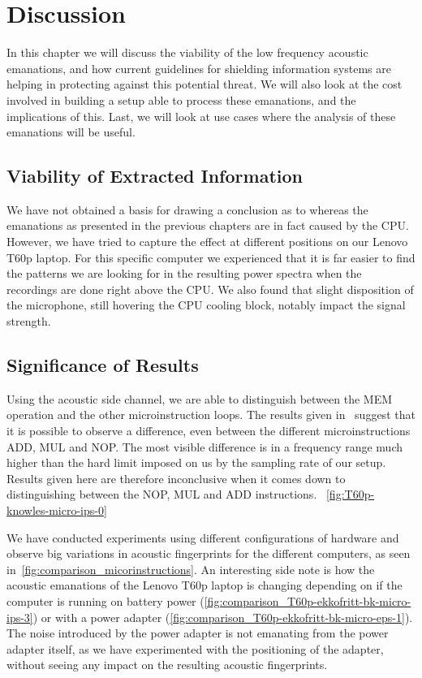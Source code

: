 \chapter{Discussion}\label{chp6:discussion}

In this chapter we will discuss the viability of the low frequency acoustic emanations, and how current guidelines for shielding information systems are helping in protecting against this potential threat.
We will also look at the cost involved in building a setup able to process these emanations, and the implications of this.
Last, we will look at use cases where the analysis of these emanations will be useful.

\section{Viability of Extracted Information}
We have not obtained a basis for drawing a conclusion as to whereas the emanations as presented in the previous chapters are in fact caused by the \gls{CPU}.
However, we have tried to capture the effect at different positions on our Lenovo T60p laptop. 
For this specific computer we experienced that it is far easier to find the patterns we are looking for in the resulting power spectra when the recordings are done right above the \gls{CPU}.
We also found that slight disposition of the microphone, still hovering the \gls{CPU} cooling block, notably impact the signal strength.


\section{Significance of Results}
Using the acoustic side channel, we are able to distinguish between the MEM operation and the other microinstruction loops.
The results given in~\cite[Fig.~2]{DBLP:conf/crypto/GenkinST14} suggest that it is possible to observe a difference, even between the different microinstructions ADD, MUL and NOP. 
The most visible difference is in a frequency range much higher than the hard limit imposed on us by the sampling rate of our setup.
Results given here are therefore inconclusive when it comes down to distinguishing between the NOP, MUL and ADD instructions.
~\autoref{fig:T60p-knowles-micro-ips-0}

We have conducted experiments using different configurations of hardware and observe big variations in acoustic fingerprints for the different computers, as seen in~\autoref{fig:comparison_micorinstructions}.
An interesting side note is how the acoustic emanations of the Lenovo T60p laptop is changing depending on if the computer is running on battery power (\autoref{fig:comparison_T60p-ekkofritt-bk-micro-ips-3}) or with a power adapter (\autoref{fig:comparison_T60p-ekkofritt-bk-micro-eps-1}).
The noise introduced by the power adapter is not emanating from the power adapter itself, as we have experimented with the positioning of the adapter, without seeing any impact on the resulting acoustic fingerprints.

